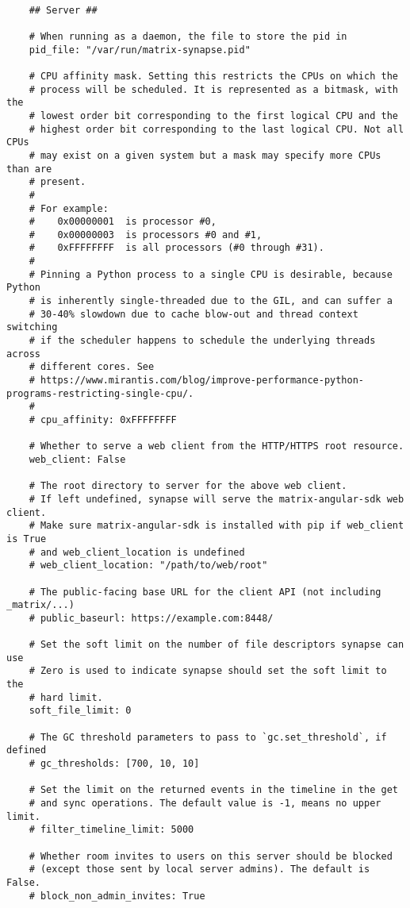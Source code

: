 \begin{lstlisting}
    
    ## Server ##
    
    # When running as a daemon, the file to store the pid in
    pid_file: "/var/run/matrix-synapse.pid"
    
    # CPU affinity mask. Setting this restricts the CPUs on which the
    # process will be scheduled. It is represented as a bitmask, with the
    # lowest order bit corresponding to the first logical CPU and the
    # highest order bit corresponding to the last logical CPU. Not all CPUs
    # may exist on a given system but a mask may specify more CPUs than are
    # present.
    #
    # For example:
    #    0x00000001  is processor #0,
    #    0x00000003  is processors #0 and #1,
    #    0xFFFFFFFF  is all processors (#0 through #31).
    #
    # Pinning a Python process to a single CPU is desirable, because Python
    # is inherently single-threaded due to the GIL, and can suffer a
    # 30-40% slowdown due to cache blow-out and thread context switching
    # if the scheduler happens to schedule the underlying threads across
    # different cores. See
    # https://www.mirantis.com/blog/improve-performance-python-programs-restricting-single-cpu/.
    #
    # cpu_affinity: 0xFFFFFFFF
    
    # Whether to serve a web client from the HTTP/HTTPS root resource.
    web_client: False
    
    # The root directory to server for the above web client.
    # If left undefined, synapse will serve the matrix-angular-sdk web client.
    # Make sure matrix-angular-sdk is installed with pip if web_client is True
    # and web_client_location is undefined
    # web_client_location: "/path/to/web/root"
    
    # The public-facing base URL for the client API (not including _matrix/...)
    # public_baseurl: https://example.com:8448/
    
    # Set the soft limit on the number of file descriptors synapse can use
    # Zero is used to indicate synapse should set the soft limit to the
    # hard limit.
    soft_file_limit: 0
    
    # The GC threshold parameters to pass to `gc.set_threshold`, if defined
    # gc_thresholds: [700, 10, 10]
    
    # Set the limit on the returned events in the timeline in the get
    # and sync operations. The default value is -1, means no upper limit.
    # filter_timeline_limit: 5000
    
    # Whether room invites to users on this server should be blocked
    # (except those sent by local server admins). The default is False.
    # block_non_admin_invites: True
    

\end{lstlisting}
